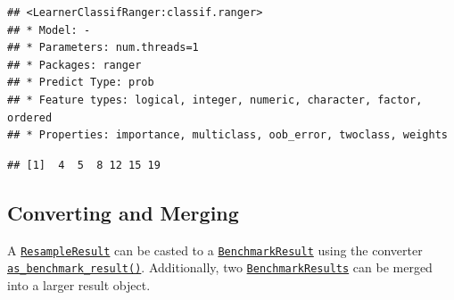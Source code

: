 \documentclass[
]{scrbook}
\newenvironment{Shaded}{\begin{snugshade}}{\end{snugshade}}
\newcommand{\CommentTok}[1]{\textcolor[rgb]{0.56,0.35,0.01}{\textit{#1}}}
\newcommand{\FunctionTok}[1]{\textcolor[rgb]{0.00,0.00,0.00}{#1}}
\newcommand{\NormalTok}[1]{#1}
\newcommand{\OtherTok}[1]{\textcolor[rgb]{0.56,0.35,0.01}{#1}}
\newcommand{\SpecialCharTok}[1]{\textcolor[rgb]{0.00,0.00,0.00}{#1}}
\newcommand{\StringTok}[1]{\textcolor[rgb]{0.31,0.60,0.02}{#1}}
\renewenvironment{Shaded} {\begin{snugshade}\small} {\end{snugshade}}
\begin{document}
\begin{verbatim}
## <LearnerClassifRanger:classif.ranger>
## * Model: -
## * Parameters: num.threads=1
## * Packages: ranger
## * Predict Type: prob
## * Feature types: logical, integer, numeric, character, factor, ordered
## * Properties: importance, multiclass, oob_error, twoclass, weights
\end{verbatim}

\begin{Shaded}
\end{Shaded}

\begin{verbatim}
## [1]  4  5  8 12 15 19
\end{verbatim}

\hypertarget{converting-and-merging}{%
\subsection{Converting and Merging}\label{converting-and-merging}}

A \href{https://mlr3.mlr-org.com/reference/ResampleResult.html}{\texttt{ResampleResult}} can be casted to a \href{https://mlr3.mlr-org.com/reference/BenchmarkResult.html}{\texttt{BenchmarkResult}} using the converter \href{https://mlr3.mlr-org.com/reference/as_benchmark_result.html}{\texttt{as\_benchmark\_result()}}.
Additionally, two \href{https://mlr3.mlr-org.com/reference/BenchmarkResult.html}{\texttt{BenchmarkResults}} can be merged into a larger result object.

\begin{Shaded}
\end{Shaded}
\end{document}
